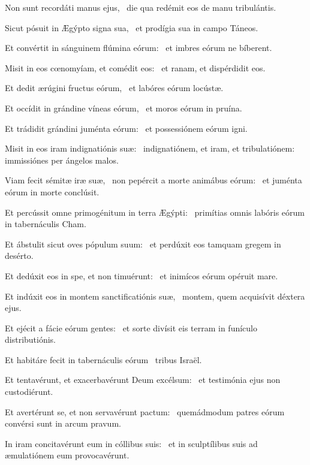 
\item Non sunt recordáti manus ejus,~\psstar{} die qua redémit eos de manu tribulántis.

\item Sicut pósuit in Ægýpto signa sua,~\psstar{} et prodígia sua in campo Táneos.

\item Et convértit in sánguinem flúmina eórum:~\psstar{} et imbres eórum ne bíberent.

\item Misit in eos cœnomyíam, et comédit eos:~\psstar{} et ranam, et dispérdidit eos.

\item Et dedit ærúgini fructus eórum,~\psstar{} et labóres eórum locústæ.

\item Et occídit in grándine víneas eórum,~\psstar{} et moros eórum in pruína.

\item Et trádidit grándini juménta eórum:~\psstar{} et possessiónem eórum igni.

\item Misit in eos iram indignatiónis suæ:~\psstar{} indignatiónem, et iram, et tribulatiónem: immissiónes per ángelos malos.

\item Viam fecit sémitæ iræ suæ,~\pscross{} non pepércit a morte animábus eórum:~\psstar{} et juménta eórum in morte conclúsit.

\item Et percússit omne primogénitum in terra Ægýpti:~\psstar{} primítias omnis labóris eórum in tabernáculis Cham.

\item Et ábstulit sicut oves pópulum suum:~\psstar{} et perdúxit eos tamquam gregem in desérto.

\item Et dedúxit eos in spe, et non timuérunt:~\psstar{} et inimícos eórum opéruit mare.

\item Et indúxit eos in montem sanctificatiónis suæ,~\psstar{} montem, quem acquisívit déxtera ejus.

\item Et ejécit a fácie eórum gentes:~\psstar{} et sorte divísit eis terram in funículo distributiónis.

\item Et habitáre fecit in tabernáculis eórum~\psstar{} tribus Israël.

\item Et tentavérunt, et exacerbavérunt Deum excélsum:~\psstar{} et testimónia ejus non custodiérunt.

\item Et avertérunt se, et non servavérunt pactum:~\psstar{} quemádmodum patres eórum convérsi sunt in arcum pravum.

\item In iram concitavérunt eum in cóllibus suis:~\psstar{} et in sculptílibus suis ad æmulatiónem eum provocavérunt.
